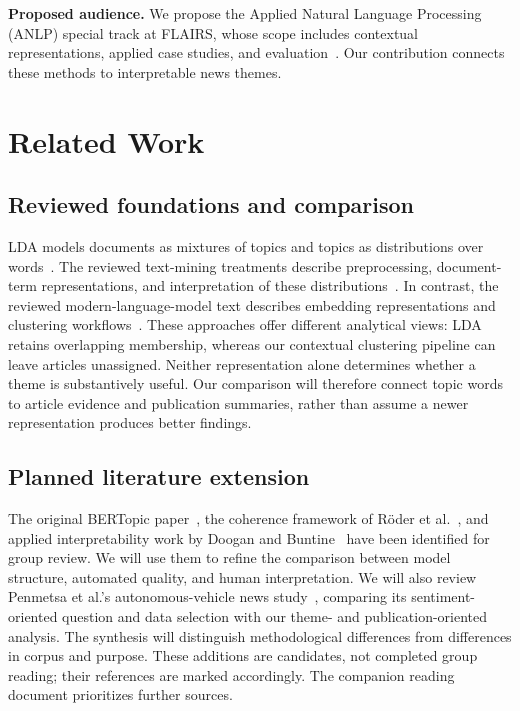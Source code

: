 \documentclass[conference]{IEEEtran}
\begin{document}
\textbf{Proposed audience.} We propose the Applied Natural Language Processing (ANLP) special track at FLAIRS, whose scope includes contextual representations, applied case studies, and evaluation~\cite{flairs2027}. Our contribution connects these methods to interpretable news themes. 

\section{Related Work}
\subsection{Reviewed foundations and comparison}
LDA models documents as mixtures of topics and topics as distributions over words~\cite{blei2003}. The reviewed text-mining treatments describe preprocessing, document-term representations, and interpretation of these distributions~\cite{qamar2024,silge2017}. In contrast, the reviewed modern-language-model text describes embedding representations and clustering workflows~\cite{alammar2024}. These approaches offer different analytical views: LDA retains overlapping membership, whereas our contextual clustering pipeline can leave articles unassigned. Neither representation alone determines whether a theme is substantively useful. Our comparison will therefore connect topic words to article evidence and publication summaries, rather than assume a newer representation produces better findings.

\subsection{Planned literature extension}
The original BERTopic paper~\cite{grootendorst2022}, the coherence framework of R\"oder et al.~\cite{roder2015}, and applied interpretability work by Doogan and Buntine~\cite{doogan2021} have been identified for group review. We will use them to refine the comparison between model structure, automated quality, and human interpretation. We will also review Penmetsa et al.'s autonomous-vehicle news study~\cite{penmetsa2023}, comparing its sentiment-oriented question and data selection with our theme- and publication-oriented analysis. The synthesis will distinguish methodological differences from differences in corpus and purpose. These additions are candidates, not completed group reading; their references are marked accordingly. The companion reading document prioritizes further sources.
\end{document}
